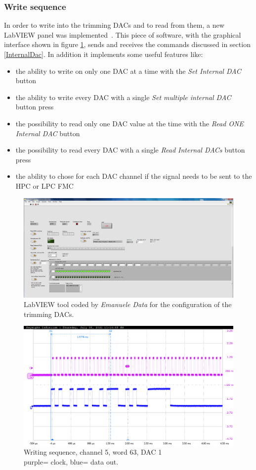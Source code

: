 \subsubsection{Write sequence}
\noindent In order to write into the trimming DACs and to read from them, a new LabVIEW panel was implemented~\cite{data}. This piece of software, with the graphical interface shown in figure \ref{fig:labview3}, sends and receives the commands discussed in section \ref{InternalDac}. In addition it implements some useful features like:
\begin{itemize}
	\item the ability to write on only one DAC at a time with the \textit{Set Internal DAC} button
	\item the ability to write every DAC with a single \textit{Set multiple internal DAC} button press
	\item the possibility to read only one DAC value at the time with the \textit{Read ONE Internal DAC} button
	\item the possibility to read every DAC with a single \textit{Read Internal DACs} button press
	\item the ability to chose for each DAC channel if the signal needs to be sent to the HPC or LPC FMC
\end{itemize}
\begin{figure}[H]
	\centering
	\includegraphics[width=0.99\linewidth]{IMG/ch3/LABVIEW2}
	\caption{LabVIEW tool coded by \textit{Emanuele Data} for the configuration of the trimming DACs.}
	\label{fig:labview3}
\end{figure}
\begin{figure}[H]
	\centering
	\includegraphics[width=0.7\linewidth]{IMG/ch5/probe/09-08-2021_ch05-write63-baselinedac1}
	\caption{Writing sequence, channel 5, word 63, DAC 1\\{\color{magenta}purple}= clock, {\color{blue}blue}= data out.}
	\label{fig:ch05write63}
\end{figure}
